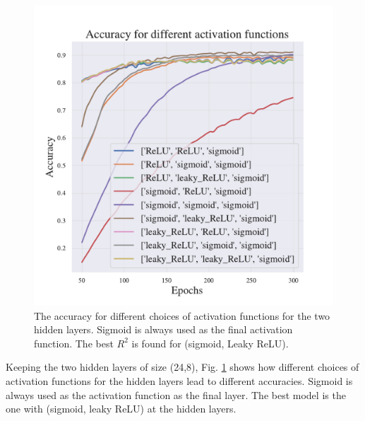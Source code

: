 \begin{figure}[h!]
    \centering
    \includegraphics[width=1.0\linewidth]{project_2/figures/Accuracy for different activation functions_classification.pdf}
    \caption{The accuracy for different choices of activation functions for the two hidden layers. Sigmoid is always used as the final activation function. The best $R^2$ is found for (sigmoid, Leaky ReLU).}
    \label{fig:activations_cancer}
\end{figure}

Keeping the two hidden layers of size (24,8), Fig. \ref{fig:activations_cancer} shows how different choices of activation functions for the hidden layers lead to different accuracies. 
Sigmoid is always used as the activation function as the final layer. 
The best model is the one with (sigmoid, leaky ReLU) at the hidden layers. 

